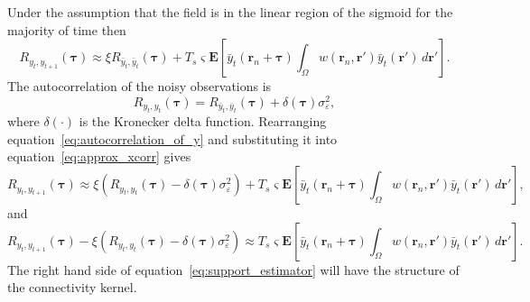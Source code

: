 \documentclass[]{article}
\begin{document}
Under the assumption that the field is in the linear region of the sigmoid for the majority of time then
\begin{equation}\label{eq:approx_xcorr}
	R_{y_{t},y_{t+1}}(\boldsymbol{\tau}) \approx \xi R_{  \bar{y}_{t},\bar{y}_{t} } (\boldsymbol{\tau}) + T_s\varsigma\mathbf{E}\left[ \bar{y}_t\left( \mathbf{r}_n + \boldsymbol{\tau} \right) \int_{\Omega}{ w\left(\mathbf{r}_n,\mathbf{r}'\right) \bar{y}_t\left( \mathbf{r}' \right)\, d\mathbf{r}'}\right].
\end{equation}
The autocorrelation of the noisy observations is
\begin{equation}\label{eq:autocorrelation_of_y}
	R_{y_{t},y_{t}}(\boldsymbol{\tau}) = R_{\bar{y}_{t},\bar{y}_{t} } (\boldsymbol{\tau}) + \delta(\boldsymbol{\tau})\sigma_{\varepsilon}^2,
\end{equation}
where $\delta(\cdot)$ is the Kronecker delta function. Rearranging equation~\ref{eq:autocorrelation_of_y} and substituting it into equation~\ref{eq:approx_xcorr} gives
\begin{equation}
	R_{y_{t},y_{t+1}}(\boldsymbol{\tau}) \approx \xi (R_{y_{t},y_{t}}(\boldsymbol{\tau}) - \delta(\boldsymbol{\tau}) \sigma_{\varepsilon}^2) + T_s\varsigma\mathbf{E}\left[ \bar{y}_t\left( \mathbf{r}_n + \boldsymbol{\tau} \right) \int_{\Omega}{ w\left(\mathbf{r}_n,\mathbf{r}'\right) \bar{y}_t\left( \mathbf{r}' \right)\, d\mathbf{r}'}\right],	
\end{equation}
and
\begin{equation}\label{eq:support_estimator}
	R_{y_{t},y_{t+1}}(\boldsymbol{\tau}) - \xi (R_{y_{t},y_{t}}(\boldsymbol{\tau}) - \delta(\boldsymbol{\tau}) \sigma_{\varepsilon}^2) \approx T_s\varsigma\mathbf{E}\left[ \bar{y}_t\left( \mathbf{r}_n + \boldsymbol{\tau} \right) \int_{\Omega}{ w\left(\mathbf{r}_n,\mathbf{r}'\right) \bar{y}_t\left( \mathbf{r}' \right)\, d\mathbf{r}'}\right].	
\end{equation}
The right hand side of equation~\ref{eq:support_estimator} will have the structure of the connectivity kernel. 
\end{document}
